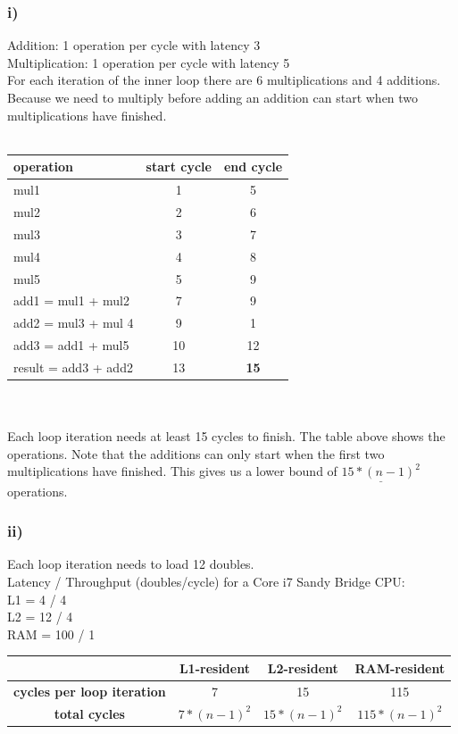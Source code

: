\documentclass[10pt,a4paper,oneside,notitlepage]{report}
\begin{document}
\subsubsection*{i)}
Addition: 1 operation per cycle with latency 3 \\
Multiplication: 1 operation per cycle with latency 5 \\
For each iteration of the inner loop there are 6 multiplications and 4 additions. Because we need to multiply before adding an addition can start when two multiplications have finished.  \\ \\
\begin{tabular}{|l|c|c|}
\hline 
\rowcolor{gray!30}
\textbf{operation} & \textbf{start cycle} & \textbf{end cycle }\\ 
\hline 
mul1 & 1 & 5 \\ 
\hline 
mul2 & 2 & 6 \\ 
\hline 
mul3 & 3 & 7 \\ 
\hline 
mul4 & 4 & 8 \\ 
\hline 
mul5 & 5 & 9 \\ 
\hline 
add1 = mul1 + mul2 & 7 & 9 \\ 
\hline 
add2 = mul3 + mul 4 & 9 & 1 \\ 
\hline 
add3 = add1 + mul5 & 10 & 12 \\ 
\hline 
result = add3 + add2 & 13 & \textbf{15} \\ 
\hline 
\end{tabular}  \\ \\
Each loop iteration needs at least 15 cycles to finish. The table above shows the operations. Note that the additions can only start when the first two multiplications have finished. This gives us a lower bound of $\underline{15*(n-1)^2}$ operations.
\subsubsection*{ii)} 
Each loop iteration needs to load 12 doubles. \\
Latency / Throughput (doubles/cycle) for a Core i7 Sandy Bridge CPU: \\
L1 = 4 / 4 \\
L2 = 12 / 4 \\
RAM = 100 / 1 \\

\begin{tabular}{|c|c|c|c|}
\hline 
\rowcolor{gray!30}
 & \textbf{L1-resident} & \textbf{L2-resident} & \textbf{RAM-resident }\\ 
\hline 
\cellcolor{gray!30} \textbf{cycles per loop iteration} & 7 & 15 & 115 \\ 
\hline 
\cellcolor{gray!30} \textbf{total cycles} & $7*(n-1)^2$ & $15*(n-1)^2$ & $115*(n-1)^2$ \\ 
\hline 
\end{tabular} 
\end{document}
